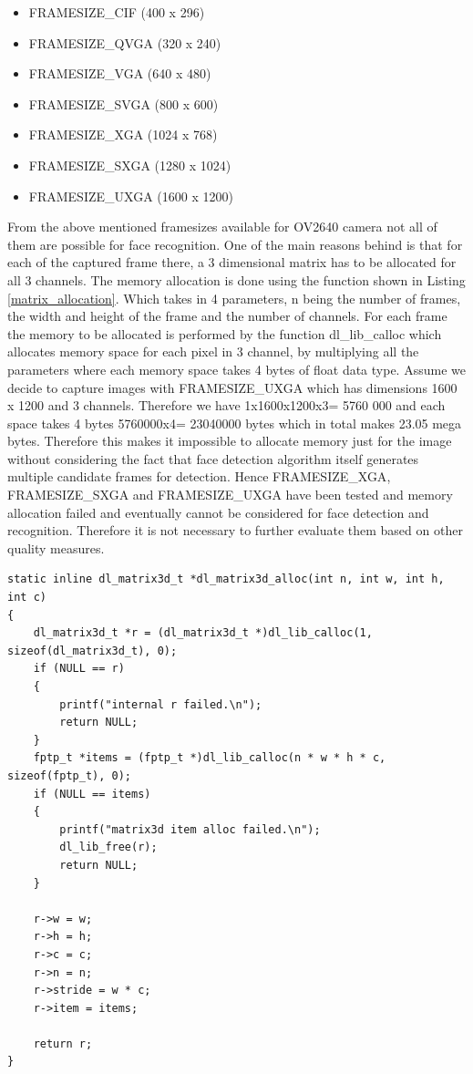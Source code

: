 \begin{itemize}
    \item FRAMESIZE\_CIF (400 x 296)
    \item FRAMESIZE\_QVGA (320 x 240)
    \item FRAMESIZE\_VGA (640 x 480)
    \item FRAMESIZE\_SVGA (800 x 600)
    \item FRAMESIZE\_XGA (1024 x 768)
    \item FRAMESIZE\_SXGA (1280 x 1024)
    \item FRAMESIZE\_UXGA (1600 x 1200)
\end{itemize}
From the above mentioned framesizes available for OV2640 camera not all of them are possible for face recognition. One of the main reasons behind is that for each of the captured frame there, a 3 dimensional matrix has to be allocated for all 3 channels. The memory allocation is done using the function shown in Listing \ref{matrix_allocation}. Which takes in 4 parameters, n being the number of frames, the width and height of the frame and the number of channels. For each frame the memory to be allocated is performed by the function {\selectfont dl\_lib\_calloc} which allocates memory space for each pixel in 3 channel, by multiplying all the parameters where each memory space takes 4 bytes of float data type. Assume we decide to capture images with  {\selectfont FRAMESIZE\_UXGA} which has dimensions 1600 x 1200 and 3 channels. Therefore we have 1x1600x1200x3= 5760 000 and each space takes 4 bytes 5760000x4= 23040000 bytes which in total makes 23.05 mega bytes. Therefore this makes it impossible to allocate memory just for the image without considering the fact that face detection algorithm itself generates multiple candidate frames for detection. Hence {\selectfont FRAMESIZE\_XGA}, {\selectfont FRAMESIZE\_SXGA} and {\selectfont FRAMESIZE\_UXGA} have been tested and memory allocation failed and eventually cannot be considered for face detection and recognition. Therefore it is not necessary to further evaluate them based on other quality measures. 

\begin{lstlisting}[caption={Allocating memory for three dimensional matrix},label=matrix_allocation, captionpos=b]
static inline dl_matrix3d_t *dl_matrix3d_alloc(int n, int w, int h, int c)
{
    dl_matrix3d_t *r = (dl_matrix3d_t *)dl_lib_calloc(1, sizeof(dl_matrix3d_t), 0);
    if (NULL == r)
    {
        printf("internal r failed.\n");
        return NULL;
    }
    fptp_t *items = (fptp_t *)dl_lib_calloc(n * w * h * c, sizeof(fptp_t), 0);
    if (NULL == items)
    {
        printf("matrix3d item alloc failed.\n");
        dl_lib_free(r);
        return NULL;
    }

    r->w = w;
    r->h = h;
    r->c = c;
    r->n = n;
    r->stride = w * c;
    r->item = items;

    return r;
}
\end{lstlisting}

